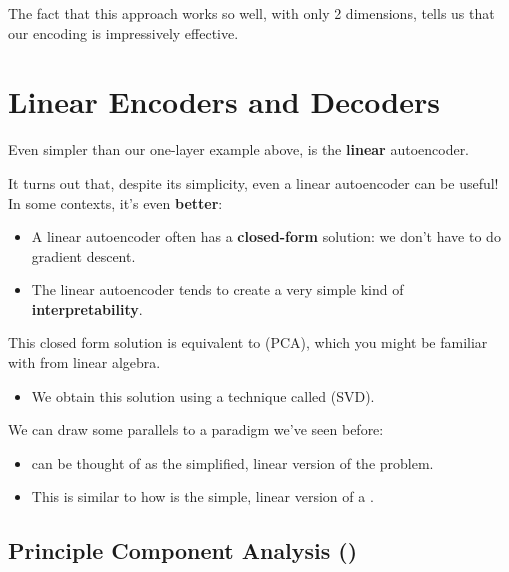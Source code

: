         The fact that this approach works so well, with only 2 dimensions, tells us that our encoding is impressively effective.

        

        

    \pagebreak

\section{Linear Encoders and Decoders}

    Even simpler than our one-layer example above, is the \textbf{linear} autoencoder.

    It turns out that, despite its simplicity, even a linear autoencoder can be useful! In some contexts, it's even \textbf{better}:

    \begin{itemize}
        \item A linear autoencoder often has a \textbf{closed-form} solution: we don't have to do gradient descent.
        \item The linear autoencoder tends to create a very simple kind of \textbf{interpretability}.
    \end{itemize}

    This closed form solution is equivalent to  (PCA), which you might be familiar with from linear algebra.

    \begin{itemize}
        \item We obtain this solution using a technique called  (SVD).
    \end{itemize}

    \subsecdiv

    We can draw some parallels to a paradigm we've seen before:

    \begin{itemize}
        \item {} can be thought of as the simplified, linear version of the  problem. 
        \item This is similar to how  is the simple, linear version of a .
    \end{itemize}

    \pagebreak

    \subsection{Principle Component Analysis ()}

